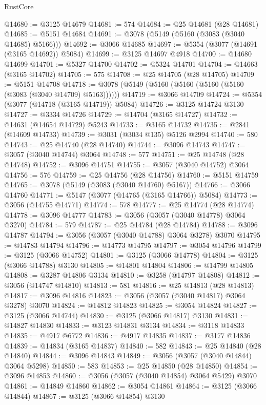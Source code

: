 \begin{lexlean}{RustCore}
\begin{coremodule}
@14680 := @3125 @14679
@14681 := 574
@14684 := @25 @14681 (@28 @14681)
@14685 := @5151 @14684
@14691 := @3078 (@5149 (@5160 (@3083 (@3040 @14685) @5166)))
@14692 := @3066 @14685
@14697 := @5354 (@3077 (@14691 (@3165 @14692)) @5084)
@14699 := @3125 @14697 @4918
@14700 := @14680 @14699
@14701 := @5327 @14700
@14702 := @5324 @14701
@14704 := @14663 (@3165 @14702)
@14705 := 575
@14708 := @25 @14705 (@28 @14705)
@14709 := @5151 @14708
@14718 := @3078 (@5149 (@5160 (@5160 (@5160 (@5160 (@3083 (@3040 @14709) @5163))))))
@14719 := @3066 @14709
@14724 := @5354 (@3077 (@14718 (@3165 @14719)) @5084)
@14726 := @3125 @14724 @3130
@14727 := @3334 @14726
@14729 := @14704 (@3165 @14727)
@14732 := @14631 (@14654 @14729) @5243
@14733 := @3165 @14732
@14735 := @2841 (@14609 @14733)
@14739 := @3031 (@3034 @135) @5126 @2994
@14740 := 580
@14743 := @25 @14740 (@28 @14740)
@14744 := @3096 @14743
@14747 := @3057 (@3040 @14744) @3064
@14748 := 577
@14751 := @25 @14748 (@28 @14748)
@14752 := @3096 @14751
@14755 := @3057 (@3040 @14752) @3064
@14756 := 576
@14759 := @25 @14756 (@28 @14756)
@14760 := @5151 @14759
@14765 := @3078 (@5149 (@3083 (@3040 @14760) @5167))
@14766 := @3066 @14760
@14771 := @5147 (@3077 (@14765 (@3165 @14766)) @5084)
@14773 := @3056 (@14755 @14771)
@14774 := 578
@14777 := @25 @14774 (@28 @14774)
@14778 := @3096 @14777
@14783 := @3056 (@3057 (@3040 @14778) @3064 @3270)
@14784 := 579
@14787 := @25 @14784 (@28 @14784)
@14788 := @3096 @14787
@14794 := @3056 (@3057 (@3040 @14788) @3064 @3278) @3070
@14795 := @14783 @14794
@14796 := @14773 @14795
@14797 := @3054 @14796
@14799 := @3125 (@3066 @14752)
@14801 := @3125 (@3066 @14778)
@14804 := @3125 (@3066 @14788) @3130
@14805 := @14801 @14804
@14806 := @14799 @14805
@14808 := @3287 @14806 @3134
@14810 := @3258 (@14797 @14808)
@14812 := @3056 (@14747 @14810)
@14813 := 581
@14816 := @25 @14813 (@28 @14813)
@14817 := @3096 @14816
@14823 := @3056 (@3057 (@3040 @14817) @3064 @3278) @3070
@14824 := @14812 @14823
@14825 := @3054 @14824
@14827 := @3125 (@3066 @14744)
@14830 := @3125 (@3066 @14817) @3130
@14831 := @14827 @14830
@14833 := @3123 @14831 @3134
@14834 := @3118 @14833
@14835 := @4917 @6772
@14836 := @4917 @14835
@14837 := @3177 @14836
@14839 := @14834 (@3165 @14837)
@14840 := 582
@14843 := @25 @14840 (@28 @14840)
@14844 := @3096 @14843
@14849 := @3056 (@3057 (@3040 @14844) @3064 @5298)
@14850 := 583
@14853 := @25 @14850 (@28 @14850)
@14854 := @3096 @14853
@14860 := @3056 (@3057 (@3040 @14854) @3064 @5429) @3070
@14861 := @14849 @14860
@14862 := @3054 @14861
@14864 := @3125 (@3066 @14844)
@14867 := @3125 (@3066 @14854) @3130

\end{coremodule}
\end{lexlean}
